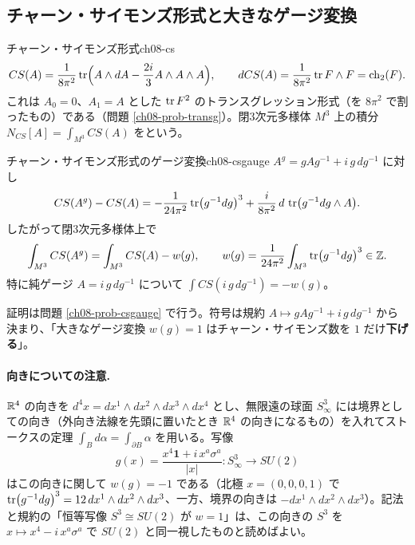 \subsection{チャーン・サイモンズ形式と大きなゲージ変換}

\begin{mydef}{チャーン・サイモンズ形式}{ch08-cs}
\[
CS(A)=\frac{1}{8\pi^2}\tr\Bigl(A\wedge dA-\frac{2i}{3}A\wedge A\wedge A\Bigr),\qquad dCS(A)=\frac{1}{8\pi^2}\tr F\wedge F=\operatorname{ch}_2(F).
\]
これは $A_0=0$、$A_1=A$ とした $\tr F^2$ のトランスグレッション形式（を $8\pi^2$ で割ったもの）である（問題 \ref{ch08-prob-transg}）。閉3次元多様体 $M^3$ 上の積分 $N_{CS}[A]=\int_{M^3}CS(A)$ をという。
\end{mydef}

\begin{mythm}{チャーン・サイモンズ形式のゲージ変換}{ch08-csgauge}
$A^g=gAg^{-1}+i\,g\,dg^{-1}$ に対し
\[
CS(A^g)-CS(A)=-\frac{1}{24\pi^2}\tr\bigl(g^{-1}dg\bigr)^3+\frac{i}{8\pi^2}\,d\,\tr\bigl(g^{-1}dg\wedge A\bigr).
\]
したがって閉3次元多様体上で
\[
\int_{M^3}CS(A^g)=\int_{M^3}CS(A)-w(g),\qquad w(g)=\frac{1}{24\pi^2}\int_{M^3}\tr(g^{-1}dg)^3\in\mathbb{Z} .
\]
特に純ゲージ $A=i\,g\,dg^{-1}$ について $\int CS(i\,g\,dg^{-1})=-w(g)$。
\end{mythm}
証明は問題 \ref{ch08-prob-csgauge} で行う。符号は規約 $A\mapsto gAg^{-1}+i\,g\,dg^{-1}$ から決まり、「大きなゲージ変換 $w(g)=1$ はチャーン・サイモンズ数を $1$ だけ\textbf{下げる}」。

\paragraph{向きについての注意.}
$\mathbb{R}^4$ の向きを $d^4x=dx^1\wedge dx^2\wedge dx^3\wedge dx^4$ とし、無限遠の球面 $S^3_\infty$ には境界としての向き（外向き法線を先頭に置いたとき $\mathbb{R}^4$ の向きになるもの）を入れてストークスの定理 $\int_{B}d\alpha=\int_{\partial B}\alpha$ を用いる。写像
\[
g(x)=\frac{x^4\mathbf 1+i\,x^a\sigma^a}{\lvert x\rvert}\colon S^3_\infty\to SU(2)
\]
はこの向きに関して $w(g)=-1$ である（北極 $x=(0,0,0,1)$ で $\tr(g^{-1}dg)^3=12\,dx^1\wedge dx^2\wedge dx^3$、一方、境界の向きは $-dx^1\wedge dx^2\wedge dx^3$）。記法と規約の「恒等写像 $S^3\cong SU(2)$ が $w=1$」は、この向きの $S^3$ を $x\mapsto x^4-i\,x^a\sigma^a$ で $SU(2)$ と同一視したものと読めばよい。

